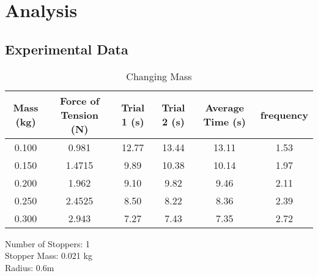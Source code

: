 \documentclass{article}[12pt]
\begin{document}
\section*{Analysis}
\subsection{Experimental Data}
\begin{table}[H]
\centering
\caption{Changing Mass}
\begin{tabular}{c c c c c c}
\hline\hline
Mass (kg) &Force of Tension (N) &Trial 1 (s)&  Trial 2 (s) & Average Time (s)& frequency \\ [0.5ex] %
\hline
0.100&0.981&12.77&13.44&13.11&1.53 \\
0.150&1.4715&9.89&10.38&10.14&1.97 \\
0.200&1.962&9.10&9.82 &9.46&2.11 \\
0.250 &2.4525& 8.50 & 8.22 & 8.36 & 2.39 \\
0.300 &2.943& 7.27 & 7.43 & 7.35 & 2.72 \\ [1ex]
\hline
\end{tabular}
\end{table}
\begin{tcolorbox}[title=\begin{center}Table 1: Constants\end{center}]
\centering
Number of Stoppers: 1\\
Stopper Mass: 0.021 kg\\
Radius: 0.6m
\end{tcolorbox}
\end{document}
